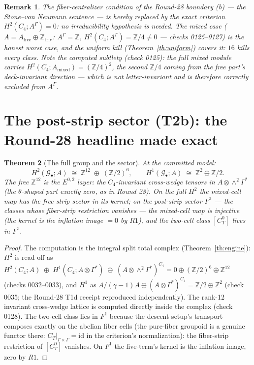 \documentclass[11pt]{article}
\newtheorem{theorem}{Theorem}
\newtheorem{remark}[theorem]{Remark}
\newcommand{\GammaL}{\Gamma}
\newcommand{\Cfour}{C_4}
\newcommand{\Gbul}{\mathcal{G}_\bullet}
\newcommand{\Z}{\mathbb{Z}}
\begin{document}
\begin{remark}
The fiber-centralizer condition of the Round-28 boundary (b) --- the
Stone--von Neumann sentence --- is hereby replaced by the exact
criterion $H^2(\Cfour;A^\GammaL)=0$: no irreducibility hypothesis is
needed. The mixed case ($A=A_{\mathrm{free}}\oplus\Z_{\mathrm{triv}}$:
$A^\GammaL=\Z$, $H^2(\Cfour;A^\GammaL)=\Z/4\ne0$ --- checks 0125--0127)
is the honest worst case, and the uniform kill (Theorem~\ref{th:uniform})
covers it: $16$ kills every class. Note the computed subtlety
(check 0125): the \emph{full} mixed module carries
$H^2(\Cfour;A_{\mathrm{mixed}})=(\Z/4)^2$, the second $\Z/4$ coming from
the free part's deck-invariant direction --- which is not
letter-invariant and is therefore correctly excluded from
$A^\GammaL$.
\end{remark}

\section{The post-strip sector (T2b): the Round-28 headline made exact}
\label{sec:sector}

\begin{theorem}[The full group and the sector]\label{th:sector}
At the committed model:
\[
H^2(\Gbul;A)\;\cong\;\Z^{12}\;\oplus\;(\Z/2)^6,
\qquad
H^1(\Gbul;A)\;\cong\;\Z^2\oplus\Z/2.
\]
The free $\Z^{12}$ is the $E^{0,2}$ layer: the $\Cfour$-invariant
cross-wedge tensors in $A\otimes\wedge^2\GammaL^*$ (the $\theta$-shaped
part exactly zero, as in Round 28). On the \emph{full} $H^2$ the
mixed-cell map has the free strip sector in its kernel; on the
\emph{post-strip sector} $F^1$ --- the classes whose fiber-strip
restriction vanishes --- the mixed-cell map is injective (the kernel is
the inflation image $=0$ by $R1$), and the two-cell class
$[C_T^0]$ lives in $F^1$.
\end{theorem}

\begin{proof}
The computation is the integral split total complex
(Theorem~\ref{th:engine}): $H^2$ is read off as
$H^2(\Cfour;A)\;\oplus\;H^1(\Cfour;A\otimes\GammaL^*)\;\oplus\;
(A\otimes\wedge^2\GammaL^*)^{\Cfour}=0\oplus(\Z/2)^6\oplus\Z^{12}$
(checks 0032--0033), and $H^1$ as
$A/(\gamma-1)A\oplus(A\otimes\GammaL^*)^{\Cfour}=\Z/2\oplus\Z^2$
(check 0035; the Round-28 T1d receipt reproduced independently). The
rank-12 invariant cross-wedge lattice is computed directly inside the
complex (check 0128). The two-cell class lies in $F^1$ because the
descent setup's transport composes exactly on the abelian fiber cells
(the pure-fiber groupoid is a genuine functor there:
$C_T|_{\GammaL\times\GammaL}=\mathrm{id}$ in the criterion's
normalization): the fiber-strip restriction of $[C_T^0]$ vanishes. On
$F^1$ the five-term's kernel is the inflation image, zero by $R1$.
\end{proof}
\end{document}
